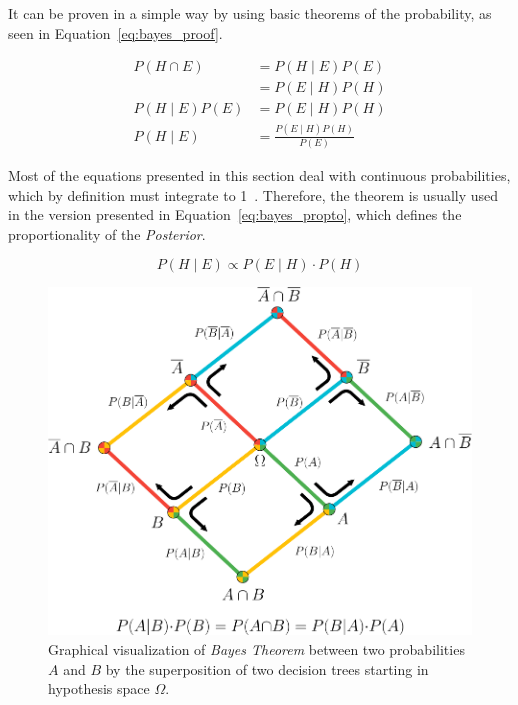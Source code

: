 It can be proven in a simple way by using basic theorems of the probability, as seen in Equation~\ref{eq:bayes_proof}.

\begin{equation}
\label{eq:bayes_proof}
\begin{aligned}
	P \left( H \cap E \right)
	&= P \left( H \mid E \right)P \left( E \right) \\
	&= P \left( E \mid H \right)P \left( H \right) \\
	P \left( H \mid E \right) P \left( E \right) &= P \left( E \mid H \right) P \left( H \right) \\
	P \left( H \mid E \right) &= \frac{P \left( E \mid H \right) P \left( H \right)}{P \left( E \right)}
\end{aligned}
\end{equation}

Most of the equations presented in this section deal with continuous probabilities, which by definition must integrate to 1~\cite{kolmogrov1956}. Therefore, the theorem is usually used in the version presented in Equation~\ref{eq:bayes_propto}, which defines the proportionality of the \emph{Posterior}.

\begin{equation}
\label{eq:bayes_propto}
	P \left( H \mid E \right) \propto P \left( E \mid H \right) \cdot P \left( H \right)
\end{equation}

\begin{figure}
\centering
\includegraphics[width=.7\textwidth]{figures/Bayes_Theorem.png}
\caption{Graphical visualization of \emph{Bayes Theorem} between two probabilities $A$ and $B$ by the superposition of two decision trees starting in hypothesis space $\Omega$.}
\label{fig:Bayes_Theorem}
\end{figure}

